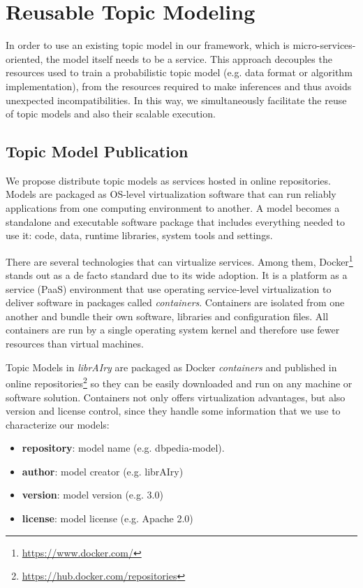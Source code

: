 \section{Reusable Topic Modeling}
\label{sec:reusable-topic-modeling}

In order to use an existing topic model in our framework, which is micro-services-oriented, the model itself needs to be a service. This approach decouples the resources used to train a probabilistic topic model (e.g. data format or algorithm implementation), from the resources required to  make inferences and thus avoids unexpected incompatibilities. In this way, we simultaneously facilitate the reuse of topic models and also their scalable execution.

\subsection{Topic Model Publication}
\label{sec:topic-model-publication}

We propose distribute topic models as services hosted in online repositories. Models are packaged as OS-level virtualization software that can run reliably applications from one computing environment to another. A model becomes a standalone and executable software package that includes everything needed to use it: code, data, runtime libraries, system tools and settings.

There are several technologies that can virtualize services. Among them, Docker\footnote{\url{https://www.docker.com/}} stands out as a de facto standard due to its wide adoption. It is a platform as a service (PaaS) environment that use operating service-level virtualization to deliver software in packages called \textit{containers}. Containers are isolated from one another and bundle their own software, libraries and configuration files. All containers are run by a single operating system kernel and therefore use fewer resources than virtual machines.

Topic Models in \textit{librAIry} are packaged as Docker \textit{containers} and published in online repositories\footnote{\url{https://hub.docker.com/repositories}} so they can be easily downloaded and run on any machine or software solution. Containers not only offers virtualization advantages, but also version and license control, since they handle some information that we use to characterize our models:
\begin{itemize}
\item \textbf{repository}: model name (e.g. dbpedia-model).
\item \textbf{author}: model creator (e.g. librAIry)
\item \textbf{version}: model version (e.g. 3.0)
\item \textbf{license}: model license (e.g. Apache 2.0)
\end{itemize}


